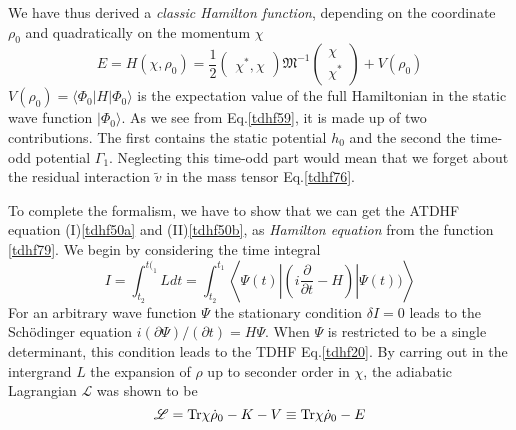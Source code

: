   We have thus derived a \textit{classic Hamilton function}, depending on the coordinate $\rho_0$ and quadratically on the momentum $\chi$
  \begin{equation}
    E = H(\chi, \rho_0) = \frac{1}{2} \label{tdhf79}
    \left(
      \begin{array}{r}
        \chi^*, \chi       
      \end{array}
    \right)
    \mathfrak{M}^{-1}
    \left(
      \begin{array}{c}
        \chi\\
        \chi^*
      \end{array}
    \right) 
    + V(\rho_0)
  \end{equation}
  $V(\rho_0) = \langle \Phi_0 | H | \Phi_0 \rangle$ is the expectation value of the full Hamiltonian in the static wave function $| \Phi_0\rangle$. As we see from Eq.\eqref{tdhf59}, it is made up of two contributions. The first contains the static potential $h_0$ and the second the time-odd potential $\Gamma_1$. Neglecting this time-odd part would mean that we forget about the residual interaction $\tilde{v}$ in the mass tensor Eq.\eqref{tdhf76}.

  To complete the formalism, we have to show that we can get the ATDHF equation (I)\eqref{tdhf50a} and (II)\eqref{tdhf50b}, as \textit{Hamilton equation} from the function \eqref{tdhf79}. We begin by considering the time integral
  \begin{equation}
    I = \int_{t_2}^{t(_1} L dt = \int_{t_2}^{t_1} \left\langle \Psi(t) \left| (i\frac{\partial}{\partial t} - H) \right| \Psi(t) )\right\rangle \label{tdhf80}
  \end{equation}
  For an arbitrary wave function $\Psi$ the stationary condition $\delta I =0$ leads to the Sch{\"o}dinger equation $i(\partial\Psi)/(\partial t) = H \Psi$. When $\Psi$ is restricted to be a single determinant, this condition leads to the TDHF Eq.\eqref{tdhf20}. By carring out in the intergrand $L$ the expansion of $\rho$ up to seconder order in $\chi$, the adiabatic Lagrangian $\mathscr{L}$ was shown to be
  \begin{equation}
    \mathscr{L} = {\rm Tr}\chi\dot{\rho}_0 - K - V \equiv {\rm Tr}\chi\dot{\rho}_0 - E \label{tdhf81}
  \end{equation}

